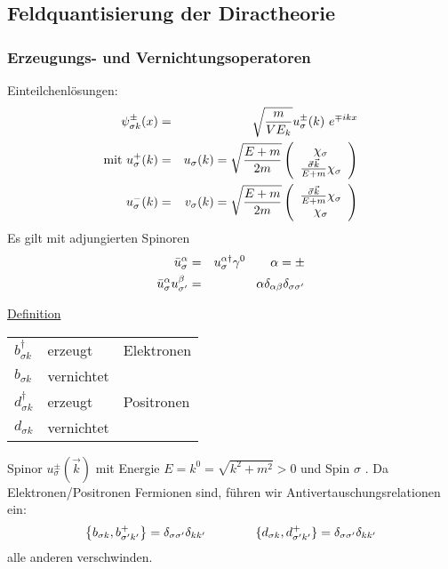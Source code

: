 \subsection{Feldquantisierung der Diractheorie}
\subsubsection{Erzeugungs- und Vernichtungsoperatoren}
Einteilchenlösungen:
\begin{eqnarray*}
\psi^\pm_{\sigma k}(x) \g \sqrt{\frac{m}{VE_k}} u_\sigma^\pm(k) \ e^{\mp i k x}\\
\text{mit  }u_\sigma^+(k) \g u_\sigma(k) = \sqrt{\frac{E+m}{2 m}} \left(\begin{array}c \chi_\sigma\\\frac{\vec \sigma \vec k}{E+m}\chi_\sigma\end{array}\ri)\\
u_\sigma^-(k) \g v_\sigma(k) = \sqrt{\frac{E+m}{2 m}} \left(\begin{array}c \frac{\vec \sigma \vec k}{E+m} \chi_\sigma\\\chi_\sigma\end{array}\ri)
\end{eqnarray*}
Es gilt mit adjungierten Spinoren
\begin{eqnarray*} \bar u_\sigma^\alpha &=& u_\sigma^{\alpha \dagger}\gamma^0\qquad \alpha = \pm\\
\bar u_\sigma^\alpha u_{\sigma'}^\beta &=&\alpha \delta_{\alpha \beta }\delta_{\sigma\sigma'}
\end{eqnarray*}

\underline{Definition}
\begin{center}
	\begin{tabular}{|l l|l|}\hline
		$b_{\sigma k}^\dagger$& erzeugt & Elektronen \\ \cline{1-2}
		$b_{\sigma k}$ & vernichtet & \\\hline
		$d_{\sigma k}^\dagger$ & erzeugt & Positronen \\ \cline{1-2}
		$d_{\sigma k}$ & vernichtet&\\\hline
	\end{tabular}
\end{center}
Spinor $u^\pm_\sigma (\vec k)$ mit Energie $ E = k^0 = \sqrt{k^2 + m^2} > 0 $ und Spin  $ \sigma$ . 
Da Elektronen/Positronen Fermionen sind, führen wir Antivertauschungsrelationen ein:
\begin{eqnarray*}
\left \{b_{\sigma k}, b^+ _{\sigma'k'}\ri \} = \delta_{\sigma\sigma'}\delta_{k k'}%
\qquad \qquad \{d_{\sigma k},d_{\sigma' k'}^+ \} = \delta_{\sigma \sigma'}\delta_{k k'}
\end{eqnarray*}
alle anderen verschwinden.
